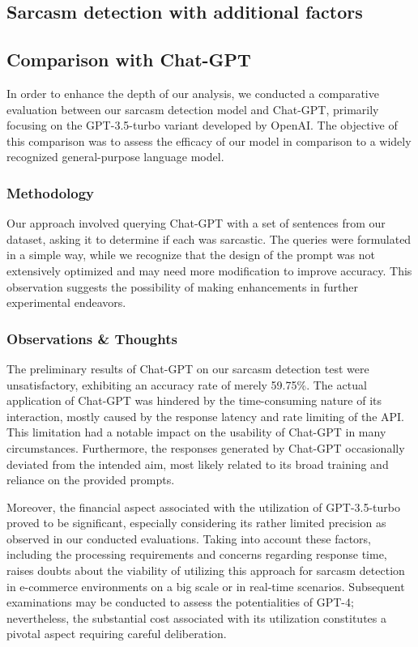 \documentclass[10pt,twocolumn,letterpaper]{article}
\begin{document}
\subsection{Sarcasm detection with additional factors}

\subsection{Comparison with Chat-GPT}
In order to enhance the depth of our analysis, we conducted a comparative evaluation between our sarcasm detection model and Chat-GPT, primarily focusing on the GPT-3.5-turbo variant developed by OpenAI.
The objective of this comparison was to assess the efficacy of our model in comparison to a widely recognized general-purpose language model.

\subsubsection{Methodology}
Our approach involved querying Chat-GPT with a set of sentences from our dataset, asking it to determine if each was sarcastic.
The queries were formulated in a simple way, while we recognize that the design of the prompt was not extensively optimized and may need more modification to improve accuracy.
This observation suggests the possibility of making enhancements in further experimental endeavors.

\subsubsection{Observations \& Thoughts}
The preliminary results of Chat-GPT on our sarcasm detection test were unsatisfactory, exhibiting an accuracy rate of merely 59.75\%.
The actual application of Chat-GPT was hindered by the time-consuming nature of its interaction, mostly caused by the response latency and rate limiting of the API. This limitation had a notable impact on the usability of Chat-GPT in many circumstances.
Furthermore, the responses generated by Chat-GPT occasionally deviated from the intended aim, most likely related to its broad training and reliance on the provided prompts.

Moreover, the financial aspect associated with the utilization of GPT-3.5-turbo proved to be significant, especially considering its rather limited precision as observed in our conducted evaluations.
Taking into account these factors, including the processing requirements and concerns regarding response time, raises doubts about the viability of utilizing this approach for sarcasm detection in e-commerce environments on a big scale or in real-time scenarios.
Subsequent examinations may be conducted to assess the potentialities of GPT-4; nevertheless, the substantial cost associated with its utilization constitutes a pivotal aspect requiring careful deliberation.
\end{document}
